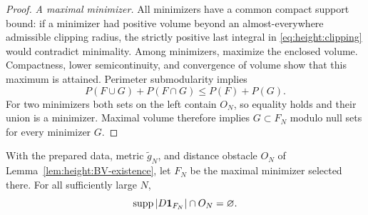 \begin{proof}
\medskip\noindent\emph{A maximal minimizer.}
All minimizers have a common compact support bound: if a minimizer had
positive volume beyond an almost-everywhere admissible clipping radius,
the strictly positive last integral in
\eqref{eq:height:clipping} would contradict minimality.
Among minimizers, maximize the enclosed volume.  Compactness,
lower semicontinuity, and convergence of volume show that this maximum
is attained.  Perimeter submodularity implies
\[
 P(F\cup G)+P(F\cap G)\le P(F)+P(G).
\]
For two minimizers both sets on the left contain $O_N$, so equality
holds and their union is a minimizer.  Maximal volume therefore implies
$G\subset F_N$ modulo null sets for every minimizer $G$.
\end{proof}

\begin{lemma}\label{lem:height:detachment}
With the prepared data, metric $\widetilde g_N$, and distance obstacle
$O_N$ of Lemma~\ref{lem:height:BV-existence}, let $F_N$ be the maximal
minimizer selected there.
For all sufficiently large $N$,
\begin{equation}\label{eq:height:detached}
 \operatorname{supp}|D\mathbf1_{F_N}|\cap O_N=\varnothing.
\end{equation}
\end{lemma}

